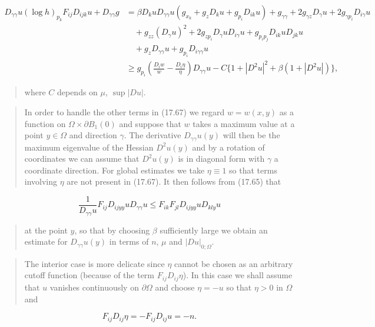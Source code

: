 \[
\begin{aligned}
D_{\gamma\gamma}u(\log h)_{p_k}F_{ij}D_{ijk}u + D_{\gamma\gamma}g
&= \beta D_k u D_{\gamma\gamma}u(g_{x_k} + g_z D_k u + g_{p_i}D_{ik}u) + g_{\gamma\gamma} + 2g_{\gamma z}D_\gamma u + 2g_{\gamma p_i}D_{i\gamma}u \\
&\quad + g_{zz}(D_\gamma u)^2 + 2g_{zp_i}D_\gamma uD_{i\gamma}u + g_{p_ip_j}D_{ik}uD_{jk}u \\
&\quad + g_z D_{\gamma\gamma}u + g_{p_i}D_{i\gamma\gamma}u \\
&\ge g_{p_i}\left(\frac{D_iw}{w} - \frac{D_i\eta}{\eta}\right)D_{\gamma\gamma}u - C\{1 + |D^2u|^2 + \beta(1 + |D^2u|)\},
\end{aligned}
\]

\begin{quote}
where $C$ depends on $\mu$, $\sup |Du|$.
\end{quote}

\begin{quote}
In order to handle the other terms in (17.67) we regard $w = w(x,y)$ as a function on $\Omega \times \partial B_1(0)$ and suppose that $w$ takes a maximum value at a point $y \in \Omega$ and direction $\gamma$. The derivative $D_{\gamma\gamma}u(y)$ will then be the maximum eigenvalue of the Hessian $D^2u(y)$ and by a rotation of coordinates we can assume that $D^2u(y)$ is in diagonal form with $\gamma$ a coordinate direction. For global estimates we take $\eta \equiv 1$ so that terms involving $\eta$ are not present in (17.67). It then follows from (17.65) that
\end{quote}

\[
\frac{1}{D_{\gamma\gamma}u}F_{ij}D_{ijyy}uD_{\gamma\gamma}u \le F_{ik}F_{jl}D_{ijyy}uD_{kly}u
\]

\begin{quote}
at the point $y$, so that by choosing $\beta$ sufficiently large we obtain an estimate for $D_{\gamma\gamma}u(y)$ in terms of $n$, $\mu$ and $|Du|_{0;\Omega}$.
\end{quote}

\begin{quote}
The interior case is more delicate since $\eta$ cannot be chosen as an arbitrary cutoff function (because of the term $F_{ij}D_{ij}\eta$). In this case we shall assume that $u$ vanishes continuously on $\partial\Omega$ and choose $\eta = -u$ so that $\eta > 0$ in $\Omega$ and
\end{quote}

\[
F_{ij}D_{ij}\eta = -F_{ij}D_{ij}u = -n.
\]

